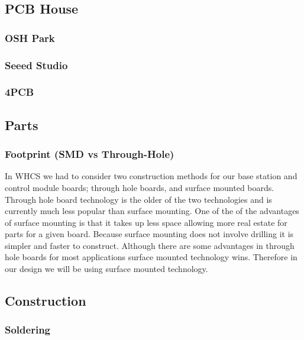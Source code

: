 \tbw

\subsection{PCB House}

\subsubsection{OSH Park}

\subsubsection{Seeed Studio}

\subsubsection{4PCB}

\subsection{Parts}

\subsubsection{Footprint (SMD vs Through-Hole)}
In WHCS we had to consider two construction methods for our base station and
control module boards; through hole boards, and surface mounted boards. Through
hole board technology is the older of the two technologies and is currently
much less popular than surface mounting. One of the of the advantages of
surface mounting is that it takes up less space allowing more real estate for
parts for a given board. Because surface mounting does not involve drilling it
is simpler and faster to construct. Although there are some advantages in
through hole boards for most applications surface mounted technology wins.
Therefore in our design we will be using surface mounted technology.

\subsection{Construction}

\subsubsection{Soldering}

